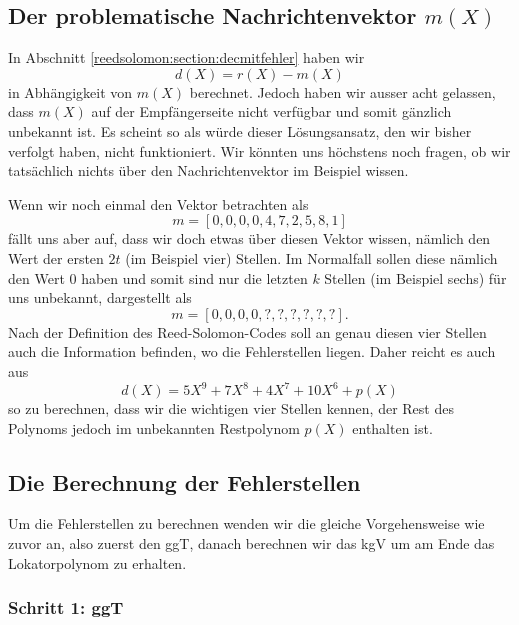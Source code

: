 \subsection{Der problematische Nachrichtenvektor $m(X)$
	\label{reedsolomon:subsection:nachrichtenvektor}}

In Abschnitt \ref{reedsolomon:section:decmitfehler} haben wir
\[
d(X) = r(X) - m(X)
\]
in Abhängigkeit von $m(X)$ berechnet. 
Jedoch haben wir ausser acht gelassen, dass $m(X)$ auf der Empfängerseite nicht verfügbar und somit gänzlich unbekannt ist.
Es scheint so als würde dieser Lösungsansatz, den wir bisher verfolgt haben, nicht funktioniert.
Wir könnten uns höchstens noch fragen, ob wir tatsächlich nichts über den Nachrichtenvektor im Beispiel wissen. 

Wenn wir noch einmal den Vektor betrachten als
\[
m = [0,0,0,0,4,7,2,5,8,1]
\]
fällt uns aber auf, dass wir doch etwas über diesen Vektor wissen, nämlich den Wert der ersten $2t$ (im Beispiel vier) Stellen.
Im Normalfall sollen diese nämlich den Wert $0$ haben und somit sind nur die letzten $k$ Stellen (im Beispiel sechs) für uns unbekannt, dargestellt als
\[
m = [0,0,0,0,?,?,?,?,?,?].
\]
Nach der Definition des Reed-Solomon-Codes soll an genau diesen vier Stellen auch die Information befinden, wo die Fehlerstellen liegen. Daher reicht es auch aus
\[
d(X) = 5X^9 + 7X^8 + 4X^7 + 10X^6 + p(X)
\]
so zu berechnen, dass wir die wichtigen vier Stellen kennen, der Rest des Polynoms jedoch im unbekannten Restpolynom $p(X)$ enthalten ist. 

\subsection{Die Berechnung der Fehlerstellen
	\label{reedsolomon:subsection:nachrichtenvektor}}

Um die Fehlerstellen zu berechnen wenden wir die gleiche Vorgehensweise wie zuvor an, also zuerst den ggT, danach berechnen wir das kgV um am Ende das Lokatorpolynom zu erhalten.

\subsubsection{Schritt 1: ggT}

